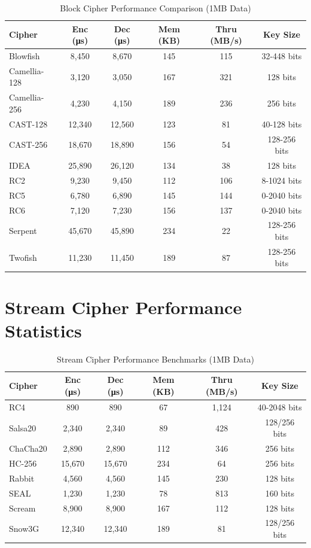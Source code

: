 \documentclass[12pt,a4paper]{article}
\newcommand{\smalltable}[1]{\small #1}
\begin{document}
\begin{table}[h]
\centering
\smalltable{
\caption{Block Cipher Performance Comparison (1MB Data)}
\begin{tabular}{|l|c|c|c|c|c|}
\hline
\textbf{Cipher} & \textbf{Enc (μs)} & \textbf{Dec (μs)} & \textbf{Mem (KB)} & \textbf{Thru (MB/s)} & \textbf{Key Size} \\
\hline
Blowfish & 8,450 & 8,670 & 145 & 115 & 32-448 bits \\
Camellia-128 & 3,120 & 3,050 & 167 & 321 & 128 bits \\
Camellia-256 & 4,230 & 4,150 & 189 & 236 & 256 bits \\
CAST-128 & 12,340 & 12,560 & 123 & 81 & 40-128 bits \\
CAST-256 & 18,670 & 18,890 & 156 & 54 & 128-256 bits \\
IDEA & 25,890 & 26,120 & 134 & 38 & 128 bits \\
RC2 & 9,230 & 9,450 & 112 & 106 & 8-1024 bits \\
RC5 & 6,780 & 6,890 & 145 & 144 & 0-2040 bits \\
RC6 & 7,120 & 7,230 & 156 & 137 & 0-2040 bits \\
Serpent & 45,670 & 45,890 & 234 & 22 & 128-256 bits \\
Twofish & 11,230 & 11,450 & 189 & 87 & 128-256 bits \\
\hline
\end{tabular}
}
\end{table}

\section{Stream Cipher Performance Statistics}

\begin{table}[h]
\centering
\smalltable{
\caption{Stream Cipher Performance Benchmarks (1MB Data)}
\begin{tabular}{|l|c|c|c|c|c|}
\hline
\textbf{Cipher} & \textbf{Enc (μs)} & \textbf{Dec (μs)} & \textbf{Mem (KB)} & \textbf{Thru (MB/s)} & \textbf{Key Size} \\
\hline
RC4 & 890 & 890 & 67 & 1,124 & 40-2048 bits \\
Salsa20 & 2,340 & 2,340 & 89 & 428 & 128/256 bits \\
ChaCha20 & 2,890 & 2,890 & 112 & 346 & 256 bits \\
HC-256 & 15,670 & 15,670 & 234 & 64 & 256 bits \\
Rabbit & 4,560 & 4,560 & 145 & 230 & 128 bits \\
SEAL & 1,230 & 1,230 & 78 & 813 & 160 bits \\
Scream & 8,900 & 8,900 & 167 & 112 & 128 bits \\
Snow3G & 12,340 & 12,340 & 189 & 81 & 128/256 bits \\
\hline
\end{tabular}
}
\end{table}
\end{document}
